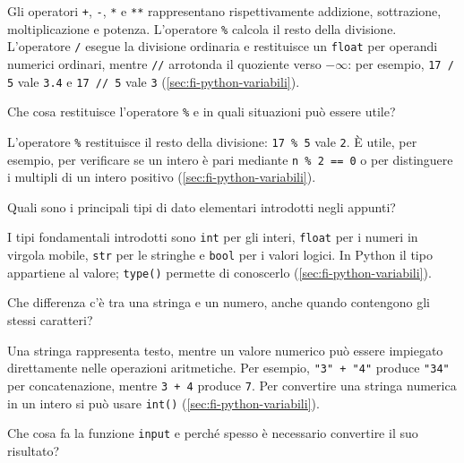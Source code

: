 Gli operatori \texttt{+}, \texttt{-}, \texttt{*} e \texttt{**}
rappresentano rispettivamente addizione, sottrazione, moltiplicazione
e potenza. L'operatore \texttt{\%} calcola il resto della divisione.
L'operatore \texttt{/} esegue la divisione ordinaria e restituisce un
\texttt{float} per operandi numerici ordinari, mentre
\lstinline|//| arrotonda il quoziente verso \(-\infty\): per esempio,
\texttt{17 / 5} vale \texttt{3.4} e \lstinline|17 // 5| vale
\texttt{3} (\cref{sec:fi-python-variabili}).

\begin{exercise}
\label{ex:fi-python-operatore-modulo}
Che cosa restituisce l'operatore \texttt{\%} e in quali situazioni può
essere utile?
\end{exercise}

L'operatore \texttt{\%} restituisce il resto della divisione:
\lstinline|17 % 5| vale \texttt{2}. È utile, per esempio, per
verificare se un intero è pari mediante \lstinline|n % 2 == 0| o
per distinguere i multipli di un intero positivo
(\cref{sec:fi-python-variabili}).

\begin{exercise}
\label{ex:fi-python-tipi-elementari}
Quali sono i principali tipi di dato elementari introdotti
negli appunti?
\end{exercise}

I tipi fondamentali introdotti sono \texttt{int} per gli interi,
\texttt{float} per i numeri in virgola mobile, \texttt{str} per le
stringhe e \texttt{bool} per i valori logici. In Python il tipo
appartiene al valore; \texttt{type()} permette di conoscerlo
(\cref{sec:fi-python-variabili}).

\begin{exercise}
\label{ex:fi-python-stringa-numero}
Che differenza c'è tra una stringa e un numero, anche quando
contengono gli stessi caratteri?
\end{exercise}

Una stringa rappresenta testo, mentre un valore numerico può essere
impiegato direttamente nelle operazioni aritmetiche. Per esempio,
\lstinline|"3" + "4"| produce \lstinline|"34"| per concatenazione,
mentre \texttt{3 + 4} produce \texttt{7}. Per convertire una stringa
numerica in un intero si può usare \texttt{int()}
(\cref{sec:fi-python-variabili}).

\begin{exercise}
\label{ex:fi-python-input-conversione}
Che cosa fa la funzione \texttt{input} e perché spesso è necessario
convertire il suo risultato?
\end{exercise}

